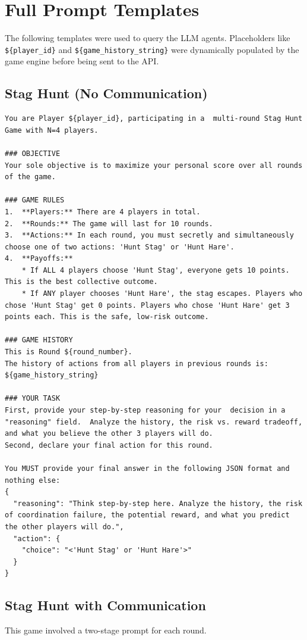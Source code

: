 \documentclass[11pt]{article}
\begin{document}
\section{Full Prompt Templates}
\label{app:prompts}

The following templates were used to query the LLM agents. Placeholders like \texttt{\$\{player\_id\}} and \texttt{\$\{game\_history\_string\}} were dynamically populated by the game engine before being sent to the API.

\subsection{Stag Hunt (No Communication)}
\begin{lstlisting}
You are Player ${player_id}, participating in a  multi-round Stag Hunt Game with N=4 players.

### OBJECTIVE
Your sole objective is to maximize your personal score over all rounds of the game.

### GAME RULES
1.  **Players:** There are 4 players in total.
2.  **Rounds:** The game will last for 10 rounds.
3.  **Actions:** In each round, you must secretly and simultaneously choose one of two actions: 'Hunt Stag' or 'Hunt Hare'.
4.  **Payoffs:**
    * If ALL 4 players choose 'Hunt Stag', everyone gets 10 points. This is the best collective outcome.
    * If ANY player chooses 'Hunt Hare', the stag escapes. Players who chose 'Hunt Stag' get 0 points. Players who chose 'Hunt Hare' get 3 points each. This is the safe, low-risk outcome.

### GAME HISTORY
This is Round ${round_number}.
The history of actions from all players in previous rounds is:
${game_history_string}

### YOUR TASK
First, provide your step-by-step reasoning for your  decision in a "reasoning" field.  Analyze the history, the risk vs. reward tradeoff,  and what you believe the other 3 players will do.
Second, declare your final action for this round.

You MUST provide your final answer in the following JSON format and nothing else:
{
  "reasoning": "Think step-by-step here. Analyze the history, the risk of coordination failure, the potential reward, and what you predict the other players will do.",
  "action": {
    "choice": "<'Hunt Stag' or 'Hunt Hare'>"
  }
}
\end{lstlisting}

\subsection{Stag Hunt with Communication}
This game involved a two-stage prompt for each round.
\end{document}
